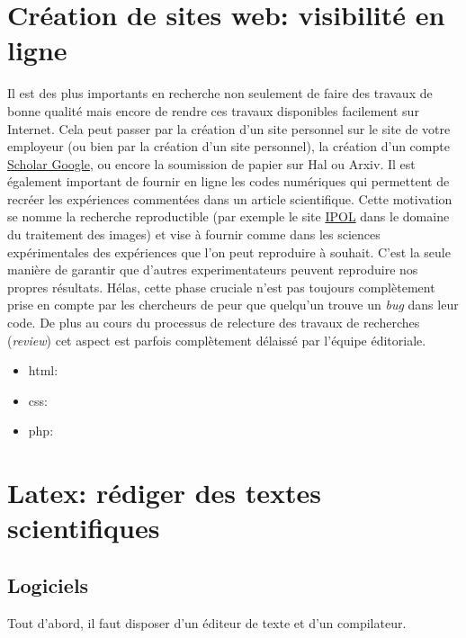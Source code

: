 \documentclass[a4paper,10pt]{book_ad}
\begin{document}
\chapter{Création de sites web: visibilité en ligne}
\minitoc
Il est des plus importants en recherche non seulement de faire des travaux de bonne qualité
mais encore de rendre ces travaux disponibles facilement sur Internet. Cela peut passer par la création
d'un site personnel sur le site de votre employeur (ou bien par la création d'un site personnel),
la création d'un compte \href{http://scholar.google.com}{Scholar Google}, ou encore la soumission de papier
sur Hal ou Arxiv.
Il est également important de fournir en ligne les codes numériques qui permettent de recréer les 
expériences commentées dans un article scientifique. Cette motivation se nomme 
la recherche reproductible (\lcf par exemple le site \href{http://www.ipol.im/}{IPOL} dans le domaine
du traitement des images)  et vise à fournir comme dans les sciences expérimentales des expériences 
que l'on peut reproduire à souhait. C'est la seule manière de garantir que d'autres experimentateurs
peuvent reproduire nos propres résultats. Hélas, cette phase cruciale n'est pas toujours complètement 
prise en compte par les chercheurs de peur que quelqu'un trouve un \textit{bug} dans leur code.
De plus au cours du processus de relecture des travaux de recherches (\textit{review}) cet
aspect est parfois complètement délaissé par l'équipe éditoriale.

\begin{itemize}
 \item  html:
 \item  css:
 \item  php:
\end{itemize}


\chapter{Latex: rédiger des textes scientifiques}
\minitoc

\section{Logiciels}
Tout d'abord, il faut disposer d'un éditeur de texte et d'un compilateur.
\end{document}
